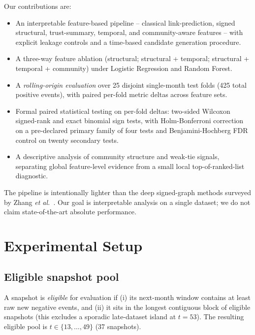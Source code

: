 Our contributions are:
\begin{itemize}
\item An interpretable feature-based pipeline -- classical
link-prediction, signed structural, trust-summary, temporal, and
community-aware features -- with explicit leakage controls and a
time-based candidate generation procedure.
\item A three-way feature ablation (structural; structural + temporal;
structural + temporal + community) under Logistic Regression and
Random Forest.
\item A \emph{rolling-origin evaluation} over 25 disjoint single-month
test folds (425 total positive events), with paired per-fold metric
deltas across feature sets.
\item Formal paired statistical testing on per-fold deltas: two-sided
Wilcoxon signed-rank and exact binomial sign tests, with
Holm-Bonferroni correction on a pre-declared primary family of four
tests and Benjamini-Hochberg FDR control on twenty secondary tests.
\item A descriptive analysis of community structure and weak-tie
signals, separating global feature-level evidence from a small local
top-of-ranked-list diagnostic.
\end{itemize}

The pipeline is intentionally lighter than the deep signed-graph
methods surveyed by Zhang \emph{et al.}~\cite{zhang2024}. Our goal is
interpretable analysis on a single dataset; we do not claim
state-of-the-art absolute performance.

\section{Experimental Setup}\label{sec:setup}

\subsection{Eligible snapshot pool}
A snapshot is \emph{eligible} for evaluation if (i) its next-month
window contains at least  raw new
negative events, and (ii) it sits in the longest contiguous block of
eligible snapshots (this excludes a sporadic late-dataset island at
$t = 53$). The resulting eligible pool is $t \in \{13, \dots, 49\}$
(37 snapshots).

